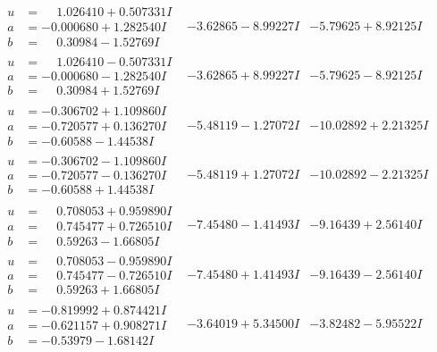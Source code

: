 \documentclass[1p]{elsarticle_modified}
\theoremstyle{definition}
\begin{document}
$$\begin{array}{c|c|c}
\begin{aligned}
u &= \phantom{-}1.026410 + 0.507331 I \\
a &= -0.000680 + 1.282540 I \\
b &= \phantom{-}0.30984 - 1.52769 I\end{aligned}
 & -3.62865 - 8.99227 I & -5.79625 + 8.92125 I \\ \hline\begin{aligned}
u &= \phantom{-}1.026410 - 0.507331 I \\
a &= -0.000680 - 1.282540 I \\
b &= \phantom{-}0.30984 + 1.52769 I\end{aligned}
 & -3.62865 + 8.99227 I & -5.79625 - 8.92125 I \\ \hline\begin{aligned}
u &= -0.306702 + 1.109860 I \\
a &= -0.720577 + 0.136270 I \\
b &= -0.60588 - 1.44538 I\end{aligned}
 & -5.48119 - 1.27072 I & -10.02892 + 2.21325 I \\ \hline\begin{aligned}
u &= -0.306702 - 1.109860 I \\
a &= -0.720577 - 0.136270 I \\
b &= -0.60588 + 1.44538 I\end{aligned}
 & -5.48119 + 1.27072 I & -10.02892 - 2.21325 I \\ \hline\begin{aligned}
u &= \phantom{-}0.708053 + 0.959890 I \\
a &= \phantom{-}0.745477 + 0.726510 I \\
b &= \phantom{-}0.59263 - 1.66805 I\end{aligned}
 & -7.45480 - 1.41493 I & -9.16439 + 2.56140 I \\ \hline\begin{aligned}
u &= \phantom{-}0.708053 - 0.959890 I \\
a &= \phantom{-}0.745477 - 0.726510 I \\
b &= \phantom{-}0.59263 + 1.66805 I\end{aligned}
 & -7.45480 + 1.41493 I & -9.16439 - 2.56140 I \\ \hline\begin{aligned}
u &= -0.819992 + 0.874421 I \\
a &= -0.621157 + 0.908271 I \\
b &= -0.53979 - 1.68142 I\end{aligned}
 & -3.64019 + 5.34500 I & -3.82482 - 5.95522 I \\ \hline\begin{aligned}

\end{aligned}
\end{array}$$
\end{document}
